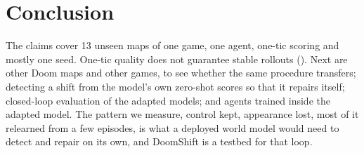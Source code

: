\section{Conclusion}
\label{sec:limits}

The claims cover 13 unseen maps of one game, one agent, one-tic scoring and mostly one seed.
One-tic quality does not guarantee stable rollouts ().
Next are other Doom maps and other games, to see whether the same procedure transfers; detecting a shift from the model's own zero-shot scores so that it repairs itself; closed-loop evaluation of the adapted models; and agents trained inside the adapted model.
The pattern we measure, control kept, appearance lost, most of it relearned from a few episodes, is what a deployed world model would need to detect and repair on its own, and DoomShift is a testbed for that loop.
\label{body-end}

